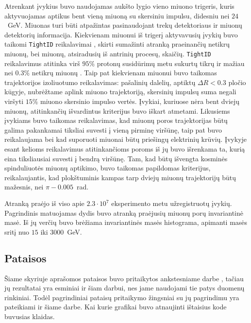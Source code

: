\documentclass[a4paper, 12pt, oneside]{article}
\newcommand{\ttt}[1]{\texttt{#1}}
\begin{document}
Atrenkant įvykius buvo naudojamas aukšto lygio vieno miuono trigeris, kuris aktyvuojamas aptikus bent vieną
miuoną su skersiniu impulsu, didesniu nei $24$~GeV.
Miuonas turi būti atpažintas pasinaudojant trekų detektoriaus ir miuonų detektorių informacija.
Kiekvienam miuonui iš trigerį aktyvavusių įvykių buvo taikomi \ttt{TightID} reikalavimai \cite{MuonID}, skirti sumažinti atranką
praeinančių netikrų miuonų, bei miuonų, atsiradusių iš antrinių procesų, skaičių.
\ttt{TightID} reikalavimus atitinka virš $95\%$ protonų susidūrimų metu sukurtų tikrų ir mažiau nei $0.3\%$ netikrų
miuonų \cite{MuonID}.
Taip pat kiekvienam miuonui buvo taikomas trajektorijos izoliuotumo reikalavimas: pašalinių dalelių, aptiktų
$\Delta R < 0.3$ pločio kūgyje, nubrėžtame aplink miuono trajektoriją, skersinių impulsų suma negali
viršyti $15\%$ miuono skersinio impulso vertės.
Įvykiai, kuriuose nėra bent dviejų miuonų, atitinkančių išvardintus kriterijus buvo iškart atmetami.
Likusiems įvykiams buvo taikomas reikalavimas, kad miuonų poros trajektorijas būtų galima pakankamai tiksliai
suvesti į vieną pirminę
viršūnę, taip pat buvo reikalaujama bei kad suporuoti miuonai būtų priešingų elektrinių krūvių.
Įvykyje esant kelioms reikalavimus atitinkančioms poroms iš jų buvo išrenkama ta, kurią eina tiksliausiai suvesti į bendrą viršūnę.
Tam, kad būtų išvengta kosminės spinduliuotės miuonų aptikimo, buvo taikomas papildomas kriterijus, reikalaujantis,
kad plokštuminis kampas tarp dviejų miuonų trajektorijų būtų mažesnis, nei $\pi-0.005$~rad.

Atranką praėjo iš viso apie $2.3\cdot10^7$ eksperimento metu užregistruotų įvykių.
Pagrindinis matuojamas dydis buvo atranką praėjusių miuonų porų invariantinė masė.
Iš jų verčių buvo brėžiama invariantinės masės histograma, apimanti masės sritį nuo $15$ iki $3000$~GeV.

\subsection{Pataisos}\label{sec:corrections}
Šiame skyriuje aprašomos pataisos buvo pritaikytos ankstesniame darbe \cite{MAk2}, tačiau jų rezultatai yra
esminiai ir šiam darbui, nes jame naudojami tie patys duomenų rinkiniai.
Todėl pagrindiniai pataisų pritaikymo žingsniai su jų pagrindimu yra pateikiami ir šiame darbe.
Kai kurie grafikai buvo atnaujinti ištaisius kode buvusias klaidas.
\end{document}
